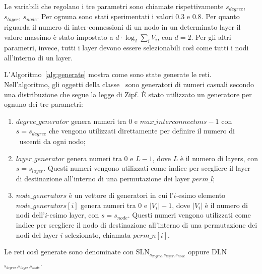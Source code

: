 Le variabili che regolano i tre parametri sono chiamate rispettivamente
$s_{degree}$, $s_{layer}$, $s_{node}$. 
Per ognuna sono stati sperimentati i valori $0.3$ e $0.8$. 
Per quanto riguarda il numero di inter-connessioni di un nodo in un determinato layer
il valore massimo è stato impostato a $d \cdot \log_2{\sum_{i}{V_i}}$, con 
$d = 2$. Per gli altri parametri, invece, tutti i layer devono essere selezionabili
così come tutti i nodi all'interno di un layer.

L'Algoritmo~\vref{alg:generate} mostra come sono state generate le reti.
Nell'algoritmo, gli oggetti della classe \tzgen\ sono generatori di numeri 
casuali secondo una distribuzione che segue la legge di Zipf. È stato utilizzato 
un generatore per ognuno dei tre parametri:
\begin{enumerate}
    \item $\mathit{degree\_generator}$ genera numeri tra 0 e $\mathit{max\_interconnectons} - 1$
        con $s = s_{\mathit{degree}}$ che vengono utilizzati direttamente per definire il 
        numero di \interc\ uscenti da ogni nodo;
    \item $\mathit{layer\_generator}$ genera numeri tra 0 e $L - 1$, dove $L$ è il 
        numero di layers, con $s = s_{\mathit{layer}}$. Questi numeri vengono utilizzati 
        come indice per scegliere il layer di destinazione all'interno di una 
        permutazione dei layer $\mathit{perm\_l}$;
    \item $\mathit{node\_generators}$ è un vettore di generatori in cui 
        l'$i$-esimo elemento $\mathit{node\_generators}[i]$ genera numeri 
        tra 0 e $|V_i| - 1$, dove $|V_i|$ è il numero di nodi dell'$i$-esimo layer, 
        con $s = s_{\mathit{node}}$. Questi numeri vengono utilizzati 
        come indice per scegliere il nodo di destinazione all'interno 
        di una permutazione dei nodi del layer $i$ selezionato, 
        chiamata $\mathit{perm\_n}[i]$.
\end{enumerate}

Le reti così generate sono denominate con 
SLN{\Large$_{ s_{\mathit{degree}}\text{,}s_{\mathit{layer}}\text{,}s_{\mathit{node}}}$}
oppure
DLN{\Large$_{ s_{\mathit{degree}}\text{,}s_{\mathit{layer}}\text{,}s_{\mathit{node}}}$}.



  

